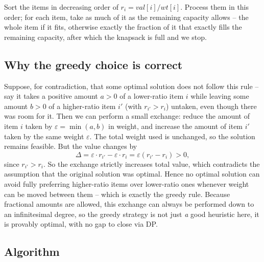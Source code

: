 \begin{ideabox}
Sort the items in decreasing order of $r_i = \textit{val}[i] /
\textit{wt}[i]$. Process them in this order; for each item, take as much of
it as the remaining capacity allows -- the whole item if it fits, otherwise
exactly the fraction of it that exactly fills the remaining capacity, after
which the knapsack is full and we stop.
\end{ideabox}

\subsection*{Why the greedy choice is correct}

Suppose, for contradiction, that some optimal solution does not follow this
rule -- say it takes a positive amount $a > 0$ of a lower-ratio item $i$
while leaving some amount $b > 0$ of a higher-ratio item $i'$ (with $r_{i'} >
r_i$) untaken, even though there was room for it. Then we can perform a small
exchange: reduce the amount of item $i$ taken by $\varepsilon =
\min(a, b)$ in weight, and increase the amount of item $i'$ taken by the same
weight $\varepsilon$. The total weight used is unchanged, so the solution
remains feasible. But the value changes by
\[
  \Delta = \varepsilon \cdot r_{i'} - \varepsilon \cdot r_i
         = \varepsilon (r_{i'} - r_i) > 0,
\]
since $r_{i'} > r_i$. So the exchange strictly increases total value, which
contradicts the assumption that the original solution was optimal. Hence no
optimal solution can avoid fully preferring higher-ratio items over
lower-ratio ones whenever weight can be moved between them -- which is
exactly the greedy rule. Because fractional amounts are allowed, this
exchange can always be performed down to an infinitesimal degree, so the
greedy strategy is not just \emph{a} good heuristic here, it is provably
optimal, with no gap to close via DP.

\subsection*{Algorithm}

